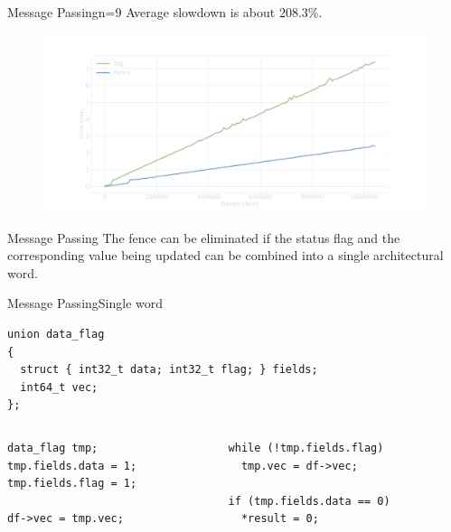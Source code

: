 \documentclass[aspectratio=169,compress]{beamer}
\begin{document}
\begin{frame}[fragile]{Message Passing}{n=9}
\centering
Average slowdown is about $208.3\%$.

\centering
	\begin{figure}
		\includegraphics[width=\textwidth]{n9.pdf}
	\end{figure}
\end{frame}

\begin{frame}[fragile]{Message Passing}{}
The fence can be eliminated if the status flag and the corresponding value being updated can 
be combined into a single architectural word. 
\end{frame}

\begin{frame}[fragile]{Message Passing}{Single word}
\centering
\begin{lstlisting}[showstringspaces=false]
union data_flag
{
  struct { int32_t data; int32_t flag; } fields;
  int64_t vec;
};
\end{lstlisting}

\begin{columns}[T]
	\begin{column}{0.45\textwidth}
\begin{lstlisting}[title={Writer}]
data_flag tmp;
tmp.fields.data = 1;
tmp.fields.flag = 1;

df->vec = tmp.vec;
\end{lstlisting}
\end{column}

\begin{column}{0.45\textwidth}
\begin{lstlisting}[title={Reader}]
while (!tmp.fields.flag)
  tmp.vec = df->vec;

if (tmp.fields.data == 0)
  *result = 0;

\end{lstlisting}
			\end{column}
	\end{columns}
\end{frame}
\end{document}
